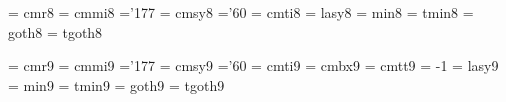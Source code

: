  \font\egtrm  = cmr8               %
 \font\egtmi  = cmmi8              %
    \skewchar\egtmi ='177          %
 \font\egtsy  = cmsy8              %
    \skewchar\egtsy ='60           %
 \font\egtit  = cmti8              %
 \font\egtly  = lasy8             %
\font\egtmin  = min8               %
\font\egttmin = tmin8              %
\font\egtgt   = goth8              %
\font\egttgt  = tgoth8             %



 \font\ninrm  = cmr9               %
 \font\ninmi  = cmmi9              %
    \skewchar\ninmi ='177          %
 \font\ninsy  = cmsy9              %
    \skewchar\ninsy ='60           %
 \font\ninit  = cmti9              %
 \font\ninbf  = cmbx9              %
 \font\nintt  = cmtt9              %
    \hyphenchar\nintt = -1         %
 \font\ninly  = lasy9             %
\font\ninmin  = min9               %
\font\nintmin = tmin9              %
\font\ningt   = goth9              %
\font\nintgt  = tgoth9             %

